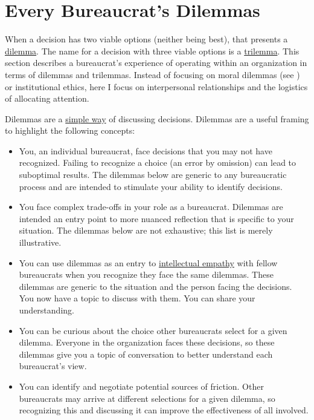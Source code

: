 \section{Every Bureaucrat's  Dilemmas\label{sec:dilemma-trilemma}}



When a decision has two viable options (neither being best), that presents a \href{https://en.wikipedia.org/wiki/Dilemma}{dilemma}. The name for a decision with three viable options is a \href{https://en.wikipedia.org/wiki/Trilemma}{trilemma}. This section describes a bureaucrat's experience of operating within an organization in terms of dilemmas and trilemmas. Instead of focusing on moral dilemmas (see \cite{2017_Zacka}) or institutional ethics, here I focus on interpersonal relationships and the logistics of allocating attention. 

Dilemmas are a \href{https://en.wikipedia.org/wiki/Defeasible_reasoning}{simple way} of discussing decisions. %
Dilemmas are a useful framing to highlight the following concepts:
\begin{itemize}
    \item You, an individual bureaucrat, face decisions that you may not have recognized. Failing to recognize a choice (an error by omission) can lead to suboptimal results. The dilemmas below are generic to any bureaucratic process and are intended to stimulate your ability to identify decisions. 
    \item You face complex trade-offs in your role as a bureaucrat. Dilemmas are intended an entry point to more nuanced reflection that is specific to your situation. The dilemmas below are not exhaustive; this list is merely illustrative. 
    \item You can use dilemmas as an entry to \href{https://en.wikipedia.org/wiki/Theory_of_mind}{intellectual empathy} with fellow bureaucrats when you recognize they face the same dilemmas. These dilemmas are generic to the situation and the person facing the decisions. You now have a topic to discuss with them. You can share your understanding. 
    \item You can be curious about the choice other bureaucrats select for a given dilemma. Everyone in the organization faces these decisions, so these dilemmas give you a topic of conversation to better understand each bureaucrat's view.
    \item You can identify and negotiate potential sources of friction. Other bureaucrats may arrive at different selections for a given dilemma, so recognizing this and discussing it can improve the effectiveness of all involved.
\end{itemize}


